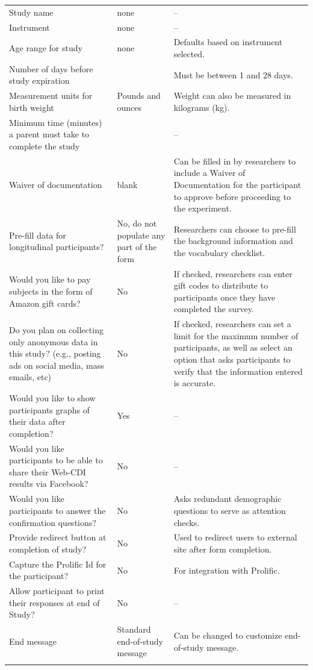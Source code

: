 \documentclass[
  english,
  ,man,floatsintext]{apa6}
\begin{document}
\begin{appendix}
\begin{longtable}[t]{>{\raggedright\arraybackslash}p{2.2in}>{\raggedright\arraybackslash}p{1.2in}>{\raggedright\arraybackslash}p{2.2in}}
\endfoot
\bottomrule
\endlastfoot
Study name & none & --\\
Instrument & none & --\\
Age range for study & none & Defaults based on instrument selected.\\
Number of days before study expiration & 14 & Must be between 1 and 28 days.\\
Measurement units for birth weight & Pounds and ounces & Weight can also be measured in kilograms (kg).\\
Minimum time (minutes) a parent must take to complete the study & 6 & --\\
Waiver of documentation & blank & Can be filled in by researchers to include a Waiver of Documentation for the participant to approve before proceeding to the experiment.\\
Pre-fill data for longitudinal participants? & No, do not populate any part of the form & Researchers can choose to pre-fill the background information and the vocabulary checklist.\\
Would you like to pay subjects in the form of Amazon gift cards? & No & If checked, researchers can enter gift codes to distribute to participants once they have completed the survey.\\
Do you plan on collecting only anonymous data in this study? (e.g., posting ads on social media, mass emails, etc) & No & If checked, researchers can set a limit for the maximum number of participants, as well as select an option that asks participants to verify that the information entered is accurate.\\
Would you like to show participants graphs of their data after completion? & Yes & --\\
Would you like participants to be able to share their Web-CDI results via Facebook? & No & --\\
Would you like participants to answer the confirmation questions? & No & Asks redundant demographic questions to serve as attention checks.\\
Provide redirect button at completion of study? & No & Used to redirect users to external site after form completion.\\
Capture the Prolific Id for the participant? & No & For integration with Prolific.\\
Allow participant to print their responses at end of Study? & No & --\\
End message & Standard end-of-study message & Can be changed to customize end-of-study message.\\*
\end{longtable}


\end{appendix}
\end{document}
